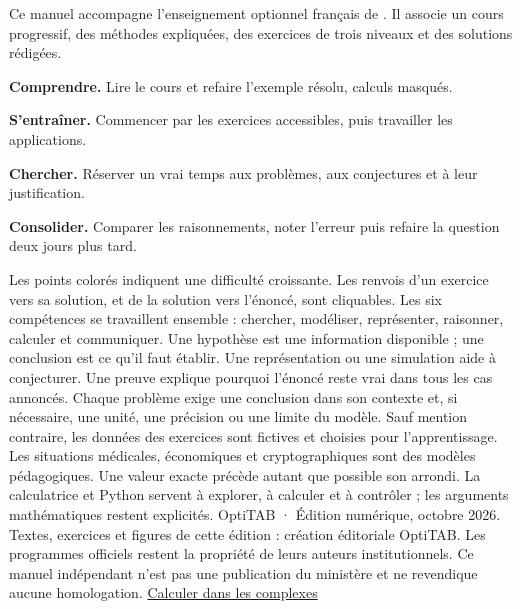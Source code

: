 \pagestyle{otFront}
Ce manuel accompagne l'enseignement optionnel français de \OptionLivre.
Il associe un cours progressif, des méthodes expliquées, des exercices de trois niveaux et des solutions rédigées.
\begin{savoirfaire}
\textbf{Comprendre.} Lire le cours et refaire l'exemple résolu, calculs masqués.\par
\textbf{S'entraîner.} Commencer par les exercices accessibles, puis travailler les applications.\par
\textbf{Chercher.} Réserver un vrai temps aux problèmes, aux conjectures et à leur justification.\par
\textbf{Consolider.} Comparer les raisonnements, noter l'erreur puis refaire la question deux jours plus tard.
\end{savoirfaire}
Les points colorés indiquent une difficulté croissante. Les renvois d'un exercice vers sa solution, et de la solution vers l'énoncé, sont cliquables.
Les six compétences se travaillent ensemble : chercher, modéliser, représenter, raisonner, calculer et communiquer.
Une hypothèse est une information disponible ; une conclusion est ce qu'il faut établir.
Une représentation ou une simulation aide à conjecturer. Une preuve explique pourquoi l'énoncé reste vrai dans tous les cas annoncés.
Chaque problème exige une conclusion dans son contexte et, si nécessaire, une unité, une précision ou une limite du modèle.
Sauf mention contraire, les données des exercices sont fictives et choisies pour l'apprentissage. Les situations médicales, économiques et cryptographiques sont des modèles pédagogiques.
Une valeur exacte précède autant que possible son arrondi. La calculatrice et Python servent à explorer, à calculer et à contrôler ; les arguments mathématiques restent explicités.
\vfill
{\small OptiTAB · Édition numérique, octobre 2026. Textes, exercices et figures de cette édition : création éditoriale OptiTAB. Les programmes officiels restent la propriété de leurs auteurs institutionnels. Ce manuel indépendant n'est pas une publication du ministère et ne revendique aucune homologation.}
\clearpage
{}
\noindent{}\hyperref[chap-1]{Calculer dans les complexes\otPoints\pageref*{chap-1}}\par\vspace{2.6mm}
